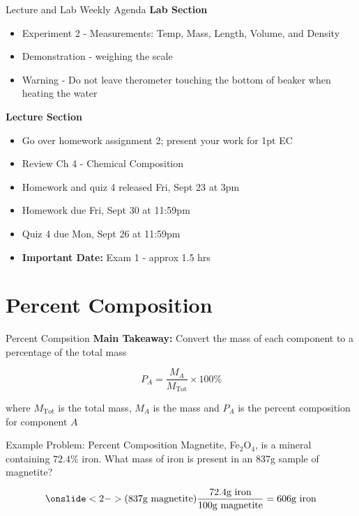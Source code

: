 \documentclass[11pt]{beamer}
\begin{document}
\begin{frame}{Lecture and Lab Weekly Agenda}
  \textbf{Lab Section}

  \begin{itemize}
  \item Experiment 2 - Measurements: Temp, Mass, Length, Volume,
    and Density
  \item Demonstration - weighing the scale
  \item Warning - Do not leave therometer touching the
    bottom of beaker when heating the water
  \end{itemize}

  \textbf{Lecture Section}

  \begin{itemize}
  \item Go over homework assignment 2; present your work
    for 1pt EC
  \item Review Ch 4 - Chemical Composition
  \item Homework and quiz 4 released Fri, Sept 23 at 3pm
  \item Homework due Fri, Sept 30 at 11:59pm
  \item Quiz 4 due Mon, Sept 26 at 11:59pm
  \item \textbf{Important Date:} Exam 1 - approx 1.5 hrs
  \end{itemize}
\end{frame}

\section{Percent Composition}

\begin{frame}{Percent Compsition}
  \textbf{Main Takeaway:} Convert the mass of each component
  to a percentage of the total mass

  \begin{equation}
    P_A = \frac{M_A}{M_\text{Tot}} \times 100\%
  \end{equation}

  where $M_\text{Tot}$ is the total mass, $M_A$ is the mass and $P_A$
  is the percent composition for component $A$
\end{frame}

\begin{frame}{Example Problem: Percent Composition}
  Magnetite, Fe$_2$O$_4$, is a mineral containing $72.4\%$ iron. What
  mass of iron is present in an 837g sample of magnetite?

  \begin{align*}
   \onslide<2->{ (837 \text{g magnetite})\frac{72.4 \text{g iron}}{100 \text{g magnetite}}
    = 606 \text{g iron}}
  \end{align*}
  
\end{frame}
\end{document}
